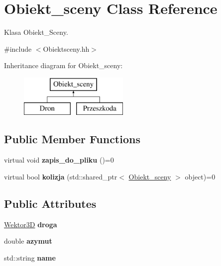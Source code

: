 \hypertarget{class_obiekt__sceny}{}\section{Obiekt\+\_\+sceny Class Reference}
\label{class_obiekt__sceny}


Klasa Obiekt\+\_\+\+Sceny.  




{\ttfamily \#include $<$Obiektsceny.\+hh$>$}

Inheritance diagram for Obiekt\+\_\+sceny\+:\begin{figure}[H]
\begin{center}
\leavevmode
\includegraphics[height=2.000000cm]{class_obiekt__sceny}
\end{center}
\end{figure}
\subsection*{Public Member Functions}
\begin{DoxyCompactItemize}
\item 
\mbox{\label{class_obiekt__sceny_a978995604b55ae168d889f55e2e9ea80}} 
virtual void {\bfseries zapis\+\_\+do\+\_\+pliku} ()=0
\item 
\mbox{\label{class_obiekt__sceny_a1c0eb137f6f579e1c20c35f7c8b2ef88}} 
virtual bool {\bfseries kolizja} (std\+::shared\+\_\+ptr$<$ \mbox{\hyperlink{class_obiekt__sceny}{Obiekt\+\_\+sceny}} $>$ object)=0
\end{DoxyCompactItemize}
\subsection*{Public Attributes}
\begin{DoxyCompactItemize}
\item 
\mbox{\label{class_obiekt__sceny_a6216b2987359205319cb9e25a844595d}} 
\mbox{\hyperlink{class_wektor}{Wektor3D}} {\bfseries droga}
\item 
\mbox{\label{class_obiekt__sceny_ac2a1569dd66072ee7247b79297e9d985}} 
double {\bfseries azymut}
\item 
\mbox{\label{class_obiekt__sceny_ab727214736ba4385bc5fe5c6f7fab36f}} 
std\+::string {\bfseries name}
\end{DoxyCompactItemize}
